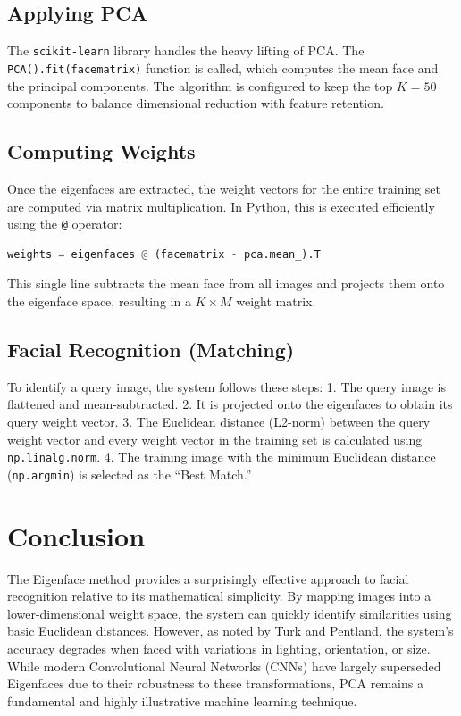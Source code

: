 \documentclass[12pt,a4paper]{article}
\begin{document}
\subsection{Applying PCA}
The \texttt{scikit-learn} library handles the heavy lifting of PCA. The \texttt{PCA().fit(facematrix)} function is called, which computes the mean face and the principal components. The algorithm is configured to keep the top $K = 50$ components to balance dimensional reduction with feature retention.

\subsection{Computing Weights}
Once the eigenfaces are extracted, the weight vectors for the entire training set are computed via matrix multiplication. In Python, this is executed efficiently using the \texttt{@} operator:
\begin{lstlisting}[language=Python]
weights = eigenfaces @ (facematrix - pca.mean_).T
\end{lstlisting}
This single line subtracts the mean face from all images and projects them onto the eigenface space, resulting in a $K \times M$ weight matrix.

\subsection{Facial Recognition (Matching)}
To identify a query image, the system follows these steps:
1. The query image is flattened and mean-subtracted.
2. It is projected onto the eigenfaces to obtain its query weight vector.
3. The Euclidean distance (L2-norm) between the query weight vector and every weight vector in the training set is calculated using \texttt{np.linalg.norm}.
4. The training image with the minimum Euclidean distance (\texttt{np.argmin}) is selected as the ``Best Match.''

\section{Conclusion}
The Eigenface method provides a surprisingly effective approach to facial recognition relative to its mathematical simplicity. By mapping images into a lower-dimensional weight space, the system can quickly identify similarities using basic Euclidean distances. However, as noted by Turk and Pentland, the system's accuracy degrades when faced with variations in lighting, orientation, or size. While modern Convolutional Neural Networks (CNNs) have largely superseded Eigenfaces due to their robustness to these transformations, PCA remains a fundamental and highly illustrative machine learning technique.
\end{document}
